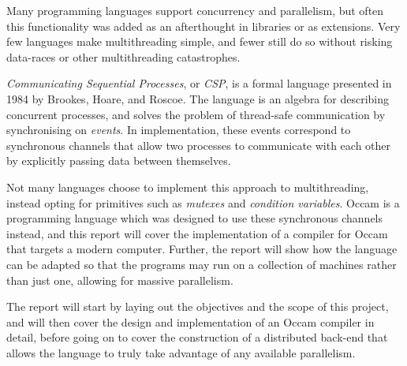 Many programming languages support concurrency and parallelism, but often this
functionality was added as an afterthought in libraries or as extensions. Very
few languages make multithreading simple, and fewer still do so without risking
data-races or other multithreading catastrophes.

\textit{Communicating Sequential Processes}, or \textit{CSP}, is a formal
language presented in 1984 by Brookes, Hoare, and Roscoe. The language is an
algebra for describing concurrent processes, and solves the problem of
thread-safe communication by synchronising on \textit{events}. In
implementation, these events correspond to synchronous channels that allow two
processes to communicate with each other by explicitly passing data between
themselves.

Not many languages choose to implement this approach to multithreading, instead
opting for primitives such as \textit{mutexes} and \textit{condition variables}.
Occam is a programming language which was designed to use these synchronous
channels instead, and this report will cover the implementation of a compiler
for Occam that targets a modern computer. Further, the report will show how the
language can be adapted so that the programs may run on a collection of machines
rather than just one, allowing for massive parallelism.

The report will start by laying out the objectives and the scope of this
project, and will then cover the design and implementation of an Occam compiler
in detail, before going on to cover the construction of a distributed back-end
that allows the language to truly take advantage of any available parallelism.
